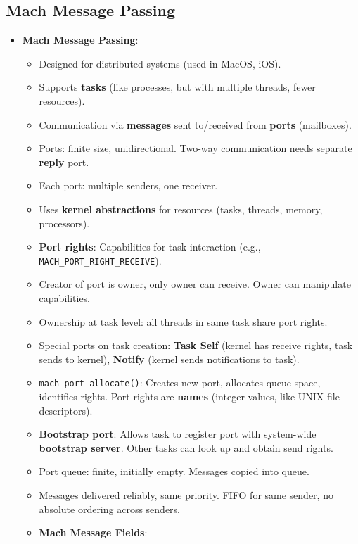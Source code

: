 \subsection{Mach Message Passing}
\begin{itemize}
    \item \textbf{Mach Message Passing}:
        \begin{itemize}
            \item Designed for distributed systems (used in MacOS, iOS).
            \item Supports \textbf{tasks} (like processes, but with multiple threads, fewer resources).
            \item Communication via \textbf{messages} sent to/received from \textbf{ports} (mailboxes).
            \item Ports: finite size, unidirectional. Two-way communication needs separate \textbf{reply} port.
            \item Each port: multiple senders, one receiver.
            \item Uses \textbf{kernel abstractions} for resources (tasks, threads, memory, processors).
            \item \textbf{Port rights}: Capabilities for task interaction (e.g., \texttt{MACH\_PORT\_RIGHT\_RECEIVE}).
            \item Creator of port is owner, only owner can receive. Owner can manipulate capabilities.
            \item Ownership at task level: all threads in same task share port rights.
            \item Special ports on task creation: \textbf{Task Self} (kernel has receive rights, task sends to kernel), \textbf{Notify} (kernel sends notifications to task).
            \item \texttt{mach\_port\_allocate()}: Creates new port, allocates queue space, identifies rights. Port rights are \textbf{names} (integer values, like UNIX file descriptors).
            \item \textbf{Bootstrap port}: Allows task to register port with system-wide \textbf{bootstrap server}. Other tasks can look up and obtain send rights.
            \item Port queue: finite, initially empty. Messages copied into queue.
            \item Messages delivered reliably, same priority. FIFO for same sender, no absolute ordering across senders.
            \item \textbf{Mach Message Fields}:

\end{itemize}
\end{itemize}
